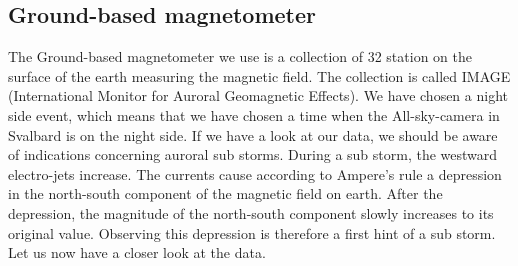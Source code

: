 \documentclass[10pt,a4paper]{article}
\begin{document}
\subsection{Ground-based magnetometer\label{0_CHAPTER_GROUNDBASEDMag}}

The Ground-based magnetometer we use is a collection of 32 station on the surface of the earth measuring the magnetic field. The collection is called 
IMAGE (International Monitor for Auroral Geomagnetic Effects). We have chosen a night side event, which means that we have chosen a time when the All-sky-camera 
in Svalbard is on the night side. If we have a look at our data, we should be aware of indications concerning auroral sub storms. During a sub storm, 
the westward electro-jets increase. The currents cause according to Ampere's rule a depression in the north-south component of the magnetic field on earth. 
After the depression, the magnitude of the north-south component slowly increases to its original value.
Observing this depression is therefore a first hint of a sub storm. Let us now have a closer look at the data. 
\end{document}
